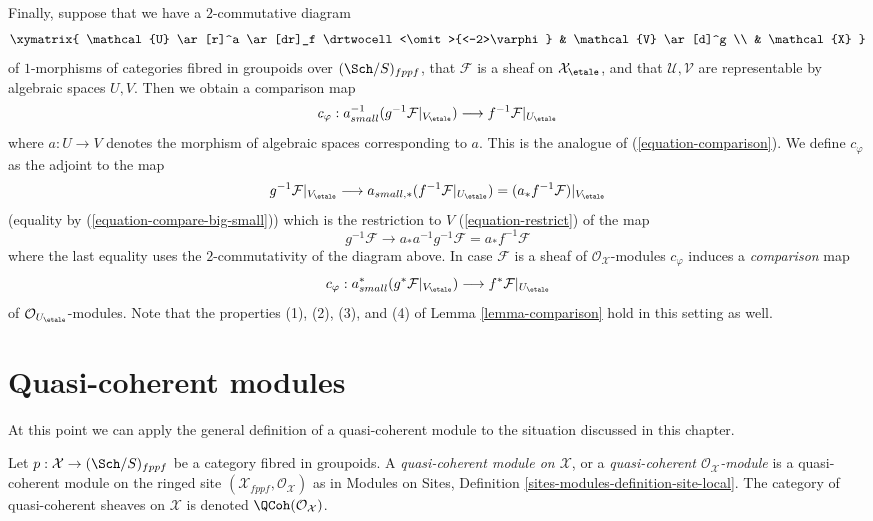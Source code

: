 \medskip\noindent
Finally, suppose that we have a $2$-commutative diagram
$$
\xymatrix{
\mathcal{U} \ar[r]^a \ar[dr]_f \drtwocell<\omit>{<-2>\varphi} &
\mathcal{V} \ar[d]^g \\
& \mathcal{X}
}
$$
of $1$-morphisms of categories fibred in groupoids over $(\Sch/S)_{fppf}$,
that $\mathcal{F}$ is a sheaf on $\mathcal{X}_\etale$,
and that $\mathcal{U}, \mathcal{V}$ are representable by algebraic
spaces $U, V$. Then we obtain a comparison map
\begin{equation}
\label{equation-comparison-algebraic-spaces}
c_\varphi : a_{small}^{-1}(g^{-1}\mathcal{F}|_{V_\etale})
\longrightarrow
f^{-1}\mathcal{F}|_{U_\etale}
\end{equation}
where $a : U \to V$ denotes the morphism of algebraic spaces corresponding
to $a$. This is the analogue of (\ref{equation-comparison}). We define
$c_\varphi$ as the adjoint to the map
$$
g^{-1}\mathcal{F}|_{V_\etale}
\longrightarrow
a_{small, *}(f^{-1}\mathcal{F}|_{U_\etale}) =
(a_*f^{-1}\mathcal{F})|_{V_\etale}
$$
(equality by (\ref{equation-compare-big-small}))
which is the restriction to $V$ (\ref{equation-restrict}) of the map
$$
g^{-1}\mathcal{F} \to a_*a^{-1}g^{-1}\mathcal{F} = a_*f^{-1}\mathcal{F}
$$
where the last equality uses the $2$-commutativity of the diagram above.
In case $\mathcal{F}$ is a sheaf of $\mathcal{O}_\mathcal{X}$-modules
$c_\varphi$ induces a {\it comparison} map
\begin{equation}
\label{equation-comparison-algebraic-spaces-modules}
c_\varphi : a_{small}^*(g^*\mathcal{F}|_{V_\etale})
\longrightarrow
f^*\mathcal{F}|_{U_\etale}
\end{equation}
of $\mathcal{O}_{U_\etale}$-modules.
Note that the properties (1), (2), (3), and (4) of
Lemma \ref{lemma-comparison}
hold in this setting as well.












\section{Quasi-coherent modules}
\label{section-quasi-coherent}

\noindent
At this point we can apply the general definition of a quasi-coherent
module to the situation discussed in this chapter.

\begin{definition}
\label{definition-quasi-coherent}
Let $p : \mathcal{X} \to (\Sch/S)_{fppf}$ be a category fibred
in groupoids. A {\it quasi-coherent module on $\mathcal{X}$}, or a
{\it quasi-coherent $\mathcal{O}_\mathcal{X}$-module} is a
quasi-coherent module on the ringed site
$(\mathcal{X}_{fppf}, \mathcal{O}_\mathcal{X})$ as in
Modules on Sites, Definition \ref{sites-modules-definition-site-local}.
The category of quasi-coherent sheaves on $\mathcal{X}$
is denoted $\QCoh(\mathcal{O}_\mathcal{X})$.
\end{definition}

